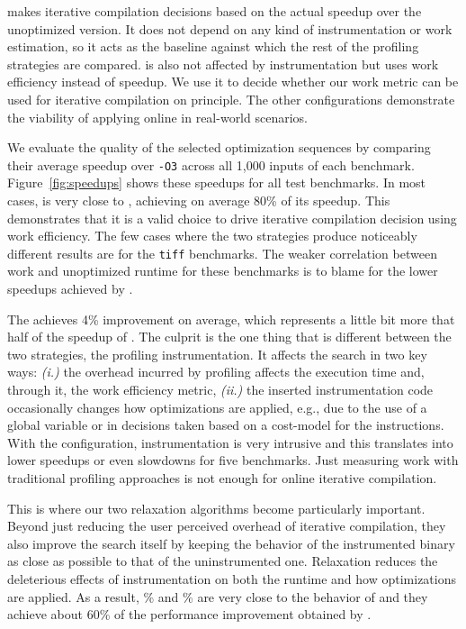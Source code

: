 \OracleRM makes iterative compilation decisions based on the actual speedup over the unoptimized version. It does not depend on any kind of
instrumentation or work estimation, so it acts as the baseline against which the rest of the profiling strategies are compared. \OraclePP
is also not affected by instrumentation but uses work efficiency instead of speedup. We use it to decide whether our work metric can be
used for iterative compilation on principle. The other configurations demonstrate the viability of applying online {\itercomp} in
real-world scenarios.

We evaluate the quality of the selected optimization sequences by comparing their average speedup over \texttt{-O3} across all 1,000 inputs
of each benchmark.
Figure~\ref{fig:speedups} shows these speedups for all test benchmarks. In most cases, \OraclePP is very close to \OracleRM, achieving on
average 80\% of its speedup. This demonstrates that it is a valid choice to drive iterative compilation decision using work efficiency. The
few cases where the two strategies produce noticeably different results are for the \texttt{tiff} benchmarks. The weaker correlation between
work and unoptimized runtime for these benchmarks is to blame for the lower speedups achieved by \OraclePP. 

The \OptProf achieves 4\% improvement on average, which represents a little bit more that half of the speedup of \OraclePP. The culprit is
the one thing that is different between the two strategies, the profiling instrumentation. It affects the search in two key ways:
\textit{(i.)} the overhead incurred by profiling affects the execution time and, through it, the work efficiency metric,
\textit{(ii.)} the inserted instrumentation code occasionally changes how optimizations are applied, e.g., due to the use of a global
variable or in decisions taken based on a cost-model for the instructions. With the \OptProf configuration, instrumentation is very
intrusive and this translates into lower speedups or even slowdowns for five benchmarks. Just measuring work with traditional profiling
approaches is not enough for online iterative compilation.

This is where our two relaxation algorithms become particularly important. Beyond just reducing the user perceived overhead of iterative
compilation, they also improve the search itself by keeping the behavior of the instrumented binary as close as possible to that of the
uninstrumented one. Relaxation reduces the deleterious effects of instrumentation on both the runtime and how optimizations are applied.
As a result, \% and \% are very close to the behavior of \OraclePP and they achieve about 60\% of the performance
improvement obtained by \OracleRM.

